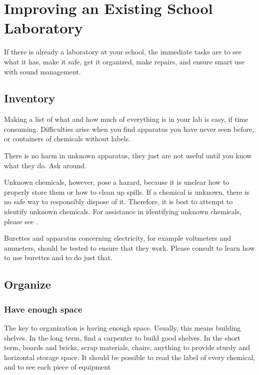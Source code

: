 \chapter{Improving an Existing School Laboratory}

If there is already a laboratory at your school, 
the immediate tasks are to see what it has, 
make it safe, 
get it organized, 
make repairs, 
and ensure smart use with sound management.

\section{Inventory}

Making a list of what and how much of everything is in your lab is easy, 
if time consuming. 
Difficulties arise when you find apparatus you have never seen before, 
or containers of chemicals without labels.

There is no harm in unknown apparatus, 
they just are not useful until you know what they do. 
Ask around.

Unknown chemicals, 
however, 
pose a hazard, 
because it is unclear how to properly store them or how to clean up spills. 
If a chemical is unknown, 
there is no safe way to responsibly dispose of it. 
Therefore, 
it is best to attempt to identify unknown chemicals. 
For assistance in identifying unknown chemicals, 
please see .

Burettes and apparatus concerning electricity, 
for example voltmeters and ammeters, 
should be tested to ensure that they work. 
Please consult 
to learn how to use burettes 
and  to do just that.

\section{Organize}

\subsection{Have enough space}
The key to organization is having enough space. 
Usually, 
this means building shelves. 
In the long term, 
find a carpenter to build good shelves. 
In the short term, 
boards and bricks, 
scrap materials, 
chairs, 
anything to provide sturdy and horizontal storage space. 
It should be possible to read the label of every chemical, 
and to see each piece of equipment


